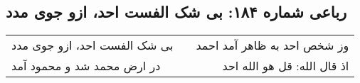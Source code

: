 \begin{center}
\section*{رباعی شماره ۱۸۴: بی شک الفست احد، ازو جوی مدد}
\label{sec:sh184}
\begin{longtable}{l p{0.5cm} r}
بی شک الفست احد، ازو جوی مدد
&&
وز شخص احد به ظاهر آمد احمد
\\
در ارض محمد شد و محمود آمد
&&
اذ قال الله: قل هو الله احد
\\
\end{longtable}
\end{center}
